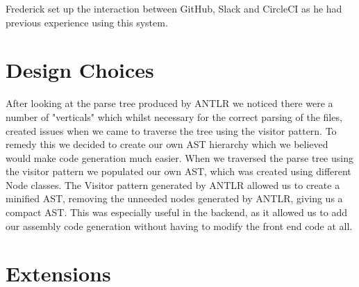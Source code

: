 \documentclass[a4paper, 11pt]{article} %
\begin{document}
Frederick set up the interaction between GitHub, Slack and CircleCI as he had previous experience using this system. 



%
%
%


\section*{Design Choices}



After looking at the parse tree produced by ANTLR we noticed there were a number of "verticals" which whilst necessary for the correct parsing of the files, created issues when we came to traverse the tree using the visitor pattern. To remedy this we decided to create our own AST hierarchy which we believed would make code generation much easier. When we traversed the parse tree using the visitor pattern we populated our own AST, which was created using different Node classes. The Visitor pattern generated by ANTLR allowed us to create a minified AST, removing the unneeded nodes generated by ANTLR, giving us a compact AST. This was especially useful in the backend, as it allowed us to add our assembly code generation without having to modify the front end code at all.


\section*{Extensions}

\end{document}
